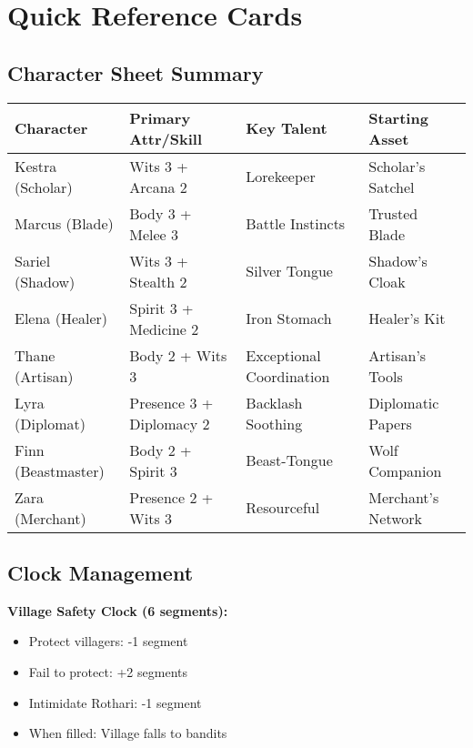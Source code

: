 \documentclass[11pt]{article}
\newcommand{\checkmark}{\ding{51}}
\begin{document}
\section{Quick Reference Cards}

\subsection{Character Sheet Summary}

\begin{center}
\begin{tabular}{|l|l|l|l|}
\hline
\textbf{Character} & \textbf{Primary Attr/Skill} & \textbf{Key Talent} & \textbf{Starting Asset} \\
\hline
Kestra (Scholar) & Wits 3 + Arcana 2 & Lorekeeper & Scholar's Satchel \\
Marcus (Blade) & Body 3 + Melee 3 & Battle Instincts & Trusted Blade \\
Sariel (Shadow) & Wits 3 + Stealth 2 & Silver Tongue & Shadow's Cloak \\
Elena (Healer) & Spirit 3 + Medicine 2 & Iron Stomach & Healer's Kit \\
Thane (Artisan) & Body 2 + Wits 3 & Exceptional Coordination & Artisan's Tools \\
Lyra (Diplomat) & Presence 3 + Diplomacy 2 & Backlash Soothing & Diplomatic Papers \\
Finn (Beastmaster) & Body 2 + Spirit 3 & Beast-Tongue & Wolf Companion \\
Zara (Merchant) & Presence 2 + Wits 3 & Resourceful & Merchant's Network \\
\hline
\end{tabular}
\end{center}

\subsection{Clock Management}

\textbf{Village Safety Clock (6 segments):}
\begin{itemize}
\item \checkmark Protect villagers: -1 segment
\item \checkmark Fail to protect: +2 segments
\item \checkmark Intimidate Rothari: -1 segment
\item When filled: Village falls to bandits
\end{itemize}
\end{document}
